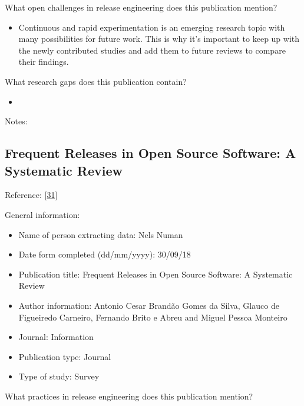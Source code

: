 \documentclass[]{book}
\providecommand{\tightlist}{%
  \setlength{\itemsep}{0pt}\setlength{\parskip}{0pt}}
\begin{document}
What open challenges in release engineering does this publication
mention?

\begin{itemize}
\tightlist
\item
  Continuous and rapid experimentation is an emerging research topic
  with many possibilities for future work. This is why it's important to
  keep up with the newly contributed studies and add them to future
  reviews to compare their findings.
\end{itemize}

What research gaps does this publication contain?

\begin{itemize}
\item
\end{itemize}

Notes:

\subsection{Frequent Releases in Open Source Software: A Systematic
Review}\label{frequent-releases-in-open-source-software-a-systematic-review}

Reference: {[}\protect\hyperlink{ref-cesar2017a}{31}{]}

General information:

\begin{itemize}
\tightlist
\item
  Name of person extracting data: Nels Numan
\item
  Date form completed (dd/mm/yyyy): 30/09/18
\item
  Publication title: Frequent Releases in Open Source Software: A
  Systematic Review
\item
  Author information: Antonio Cesar Brandão Gomes da Silva, Glauco de
  Figueiredo Carneiro, Fernando Brito e Abreu and Miguel Pessoa Monteiro
\item
  Journal: Information
\item
  Publication type: Journal
\item
  Type of study: Survey
\end{itemize}

What practices in release engineering does this publication mention?
\end{document}

